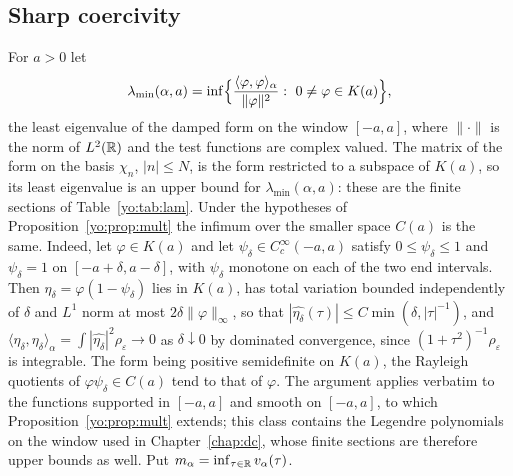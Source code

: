 \subsection{Sharp coercivity}\label{yo:sec:coercive}

For $a>0$ let
\[
\lambda_{\min}(\alpha,a)=\inf\Bigl\{\frac{\langle\varphi,\varphi\rangle_\alpha}{\|\varphi\|^2}:\ 0\ne\varphi\in K(a)\Bigr\},
\]
the least eigenvalue of the damped form on the window $[-a,a]$, where $\|\cdot\|$ is the norm of $L^2(\mathbb{R})$ and the test functions are complex valued. The matrix of the form on the basis $\chi_n$, $|n|\le N$, is the form restricted to a subspace of $K(a)$, so its least eigenvalue is an upper bound for $\lambda_{\min}(\alpha,a)$: these are the finite sections of Table~\ref{yo:tab:lam}. Under the hypotheses of Proposition~\ref{yo:prop:mult} the infimum over the smaller space $C(a)$ is the same. Indeed, let $\varphi\in K(a)$ and let $\psi_\delta\in C_c^\infty(-a,a)$ satisfy $0\le\psi_\delta\le1$ and $\psi_\delta=1$ on $[-a+\delta,a-\delta]$, with $\psi_\delta$ monotone on each of the two end intervals. Then $\eta_\delta=\varphi(1-\psi_\delta)$ lies in $K(a)$, has total variation bounded independently of $\delta$ and $L^1$ norm at most $2\delta\|\varphi\|_\infty$, so that $|\widehat{\eta_\delta}(\tau)|\le C\min(\delta,|\tau|^{-1})$, and $\langle\eta_\delta,\eta_\delta\rangle_\alpha=\int|\widehat{\eta_\delta}|^2\rho_\varepsilon\to0$ as $\delta\downarrow0$ by dominated convergence, since $(1+\tau^2)^{-1}\rho_\varepsilon$ is integrable. The form being positive semidefinite on $K(a)$, the Rayleigh quotients of $\varphi\psi_\delta\in C(a)$ tend to that of $\varphi$. The argument applies verbatim to the functions supported in $[-a,a]$ and smooth on $[-a,a]$, to which Proposition~\ref{yo:prop:mult} extends; this class contains the Legendre polynomials on the window used in Chapter~\ref{chap:dc}, whose finite sections are therefore upper bounds as well. Put $m_\alpha=\inf_{\tau\in\mathbb{R}}v_\alpha(\tau)$.

